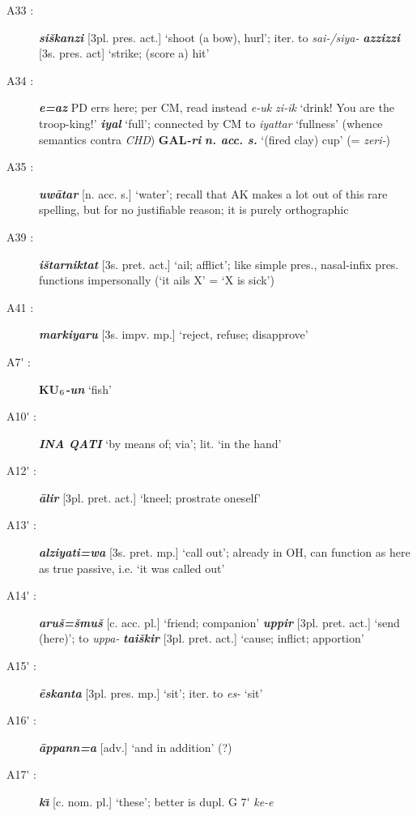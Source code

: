 \documentclass[10pt]{article}
\newcommand{\subsc}[1]{$_{\textrm{\scriptsize{#1}}}$}	%
\newcommand{\bit}[1]{\textbf{\textit{#1}}}				%
\newcommand{\p}[1]{{\tiny[{#1}]}}					%
\newcommand{\I}{\={\i}}									%
\newcommand{\pr}{\'{ }}									%
\newcommand{\hith}{\textsubwedge{h}}
\renewcommand{\.}[1]{\textsubdot{#1}}
\begin{document}
\begin{description}
\item[A33 :] \bit{si\v{s}kanzi} \p{3pl. pres. act.} `shoot (a bow), hurl'; iter. to \textit{sai-/siya-} \bit{{\hith}azzizzi} \p{3s. pres. act} `strike; (score a) hit'

\item[A34 :] \bit{e=az} PD errs here; per CM, read instead \textit{e-uk zi-ik} `drink! You are the troop-king!'  \bit{iyal} `full'; connected by CM to \textit{iyattar} `fullness' (whence semantics contra \textit{CHD}) \textbf{GAL}\bit{-ri} \bit{n. acc. s.} `(fired clay) cup' (= \textit{zeri-})

\item[A35 :] \bit{uw\=atar} \p{n. acc. s.} `water'; recall that AK makes a lot out of this rare spelling, but for no justifiable reason; it is purely orthographic

\item[A39 :] \bit{i\v{s}tarniktat} \p{3s. pret. act.} `ail; afflict'; like simple pres., nasal-infix pres. functions impersonally (`it ails X' = `X is sick')
 
\item[A41 :] \bit{markiyaru} \p{3s. impv. mp.} `reject, refuse; disapprove' 

\item[A7{\pr} :] \textbf{KU\subsc{6}}\bit{-un} `fish'

\item[A10{\pr} :] \bit{INA QATI} `by means of; via'; lit. `in the hand'

\item[A12{\pr} :] \bit{{\hith}\=alir} \p{3pl. pret. act.} `kneel; prostrate oneself'

\item[A13{\pr} :] \bit{{\hith}alziyati=wa} \p{3s. pret. mp.} `call out'; already in OH, can function as here as true passive, i.e. `it was called out'

\item[A14{\pr} :] \bit{aru\v{s}=\v{s}mu\v{s}} \p{c. acc. pl.} `friend; companion' \bit{uppir} \p{3pl. pret. act.} `send (here)'; to \textit{uppa-}  \bit{ta{\hith}i\v{s}kir} \p{3pl. pret. act.} `cause; inflict; apportion'

\item[A15{\pr} :] \bit{\=eskanta} \p{3pl. pres. mp.} `sit'; iter. to \textit{es-} `sit'

\item[A16{\pr} :] \bit{\=appann=a} \p{adv.} `and in addition' (?)

\item[A17{\pr} :] \bit{k\I} \p{c. nom. pl.} `these'; better is dupl. G 7{\pr} \textit{ke-e}


\end{description}
\end{document}
